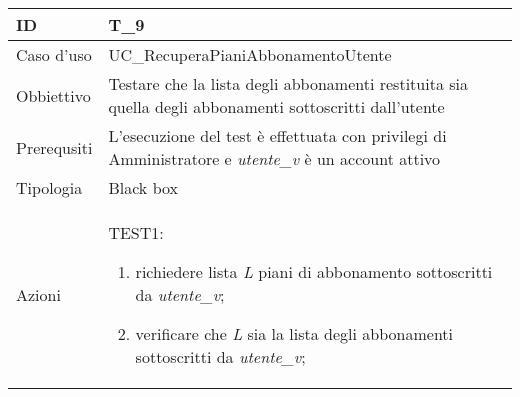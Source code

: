 \begin{table}[hb]
    \centering
    \begin{tabular}{ |p{2cm}|p{10cm}|  }
        \hline
        ID          & T\_9                                                                                                      \\\hline
        Caso d'uso  & UC\_RecuperaPianiAbbonamentoUtente                                                                        \\\hline
        Obbiettivo  & Testare che la lista degli abbonamenti restituita sia quella degli abbonamenti
        sottoscritti dall'utente                                                                                                \\\hline
        Prerequsiti & L'esecuzione del test è effettuata con privilegi di Amministratore e \emph{utente\_v} è un account attivo \\\hline
        Tipologia   & Black box                                                                                                 \\\hline
        Azioni      &
        TEST1:
        \begin{enumerate}[nosep, topsep=0pt]
            \item richiedere lista \emph{L} piani di abbonamento sottoscritti da \emph{utente\_v};
            \item verificare che \emph{L} sia la lista degli abbonamenti sottoscritti da \emph{utente\_v};
        \end{enumerate}
        \\\hline
    \end{tabular}
\end{table}

